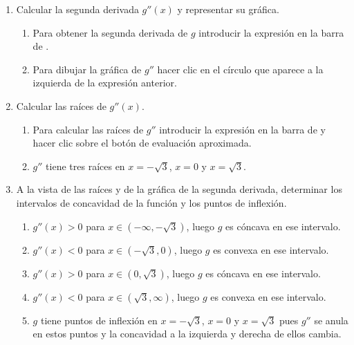 \begin{enumerate}[leftmargin=*]
\begin{enumerate}
      \item Calcular la segunda derivada $g''(x)$ y representar su gráfica.
            \begin{indication}
            \begin{enumerate}
            \item Para obtener la segunda derivada de $g$ introducir la expresión  en la barra de .
            \item Para dibujar la gráfica de $g''$ hacer clic en el círculo que aparece a la izquierda de la expresión anterior.
            \end{enumerate}
            \end{indication}

      \item Calcular las raíces de $g''(x).$
            \begin{indication}
            \begin{enumerate}
            \item Para calcular las raíces de $g''$ introducir la expresión  en la barra de  y hacer clic sobre el botón de evaluación aproximada.
            \item $g''$ tiene tres raíces en $x=-\sqrt{3}$, $x=0$ y $x=\sqrt{3}$.
            \end{enumerate}
            \end{indication}

      \item A la vista de las raíces y de la gráfica de la segunda derivada, determinar los intervalos de concavidad de la función y los puntos de inflexión.
            \begin{indication}
            \begin{enumerate}
            \item $g''(x)>0$ para $x\in (-\infty, -\sqrt{3})$, luego $g$ es cóncava en ese intervalo.
            \item $g''(x)<0$ para $x\in (-\sqrt{3}, 0)$, luego $g$ es convexa en ese intervalo.
            \item $g''(x)>0$ para $x\in (0, \sqrt{3})$, luego $g$ es cóncava en ese intervalo.
            \item $g''(x)<0$ para $x\in (\sqrt{3}, \infty)$, luego $g$ es convexa en ese intervalo.
            \item $g$ tiene puntos de inflexión en $x=-\sqrt{3}$, $x=0$ y $x=\sqrt{3}$ pues $g''$ se anula en estos puntos y la concavidad a la izquierda y derecha de ellos cambia.
            \end{enumerate}
            \end{indication}
      \end{enumerate}

\end{enumerate}


